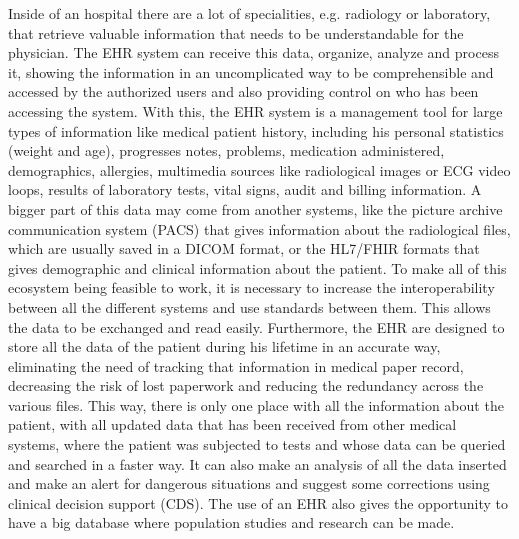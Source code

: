 \documentclass[mim_thesis.tex]{subfiles}
\begin{document}
Inside of an hospital there are a lot of specialities, e.g. radiology or laboratory, that retrieve valuable information that needs to be understandable for the physician. The EHR system can receive this data, organize, analyze and process it, showing the information in an uncomplicated way to be comprehensible and accessed by the authorized users and also providing control on who has been accessing the system. With this, the EHR system is a management tool for large types of information like medical patient history, including his personal statistics (weight and age), progresses notes, problems, medication administered, demographics, allergies, multimedia sources like radiological images or ECG video loops, results of laboratory tests, vital signs, audit and billing information. A bigger part of this data may come from another systems, like the picture archive communication system (PACS) that gives information about the radiological files, which are usually saved in a DICOM format, or the HL7/FHIR formats that gives demographic and clinical information about the patient. To make all of this ecosystem being feasible to work, it is necessary to increase the interoperability between all the different systems and use standards between them. This allows the data to be exchanged and read easily. 
Furthermore, the EHR are designed to store all the data of the patient during his lifetime in an accurate way, eliminating the need of tracking that information in medical paper record, decreasing the risk of lost paperwork and reducing the redundancy across the various files. This way, there is only one place with all the information about the patient, with all updated data that has been received from other medical systems, where the patient was subjected to tests and whose data can be queried and searched in a faster way. It can also make an analysis of all the data inserted and make an alert for dangerous situations and suggest some corrections using clinical decision support (CDS). The use of an EHR also gives the opportunity to have a big database where population studies and research can be made. \\
\end{document}
